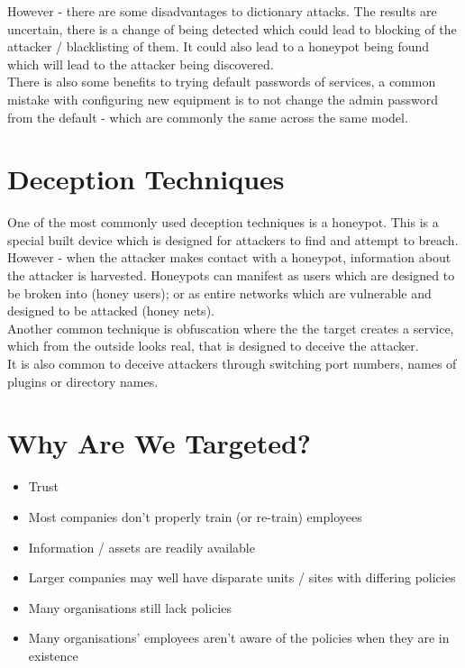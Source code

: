 However - there are some disadvantages to dictionary attacks. The results are uncertain, there is a change of being detected which could lead to blocking of the attacker / blacklisting of them. It could also lead to a honeypot being found which will lead to the attacker being discovered.\\

There is also some benefits to trying default passwords of services, a common mistake with configuring new equipment is to not change the admin password from the default - which are commonly the same across the same model. 

\section{Deception Techniques}
One of the most commonly used deception techniques is a honeypot. This is a special built device which is designed for attackers to find and attempt to breach. However - when the attacker makes contact with a honeypot, information about the attacker is harvested. Honeypots can manifest as users which are designed to be broken into (honey users); or as entire networks which are vulnerable and designed to be attacked (honey nets).\\

Another common technique is obfuscation where the the target creates a service, which from the outside looks real, that is designed to deceive the attacker.\\

It is also common to deceive attackers through switching port numbers, names of plugins or directory names.

\section{Why Are We Targeted?}
\begin{itemize}
    \item Trust
    \item Most companies don't properly train (or re-train) employees
    \item Information / assets are readily available
    \item Larger companies may well have disparate units / sites with differing policies
    \item Many organisations still lack policies
    \item Many organisations' employees aren't aware of the policies when they are in existence
\end{itemize}